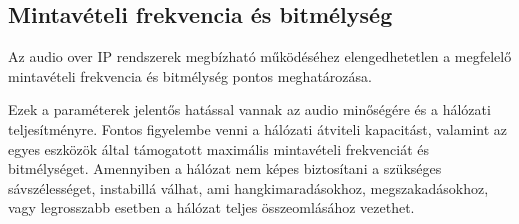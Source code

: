 \subsection{Mintavételi frekvencia és bitmélység}
Az audio over IP rendszerek megbízható működéséhez elengedhetetlen a megfelelő mintavételi frekvencia és bitmélység pontos meghatározása.

Ezek a paraméterek jelentős hatással vannak az audio minőségére és a hálózati teljesítményre. 
Fontos figyelembe venni a hálózati átviteli kapacitást, valamint az egyes eszközök által támogatott 
maximális mintavételi frekvenciát és bitmélységet. Amennyiben a hálózat nem képes biztosítani a 
szükséges sávszélességet, instabillá válhat, ami hangkimaradásokhoz, megszakadásokhoz, vagy 
legrosszabb esetben a hálózat teljes összeomlásához vezethet.

